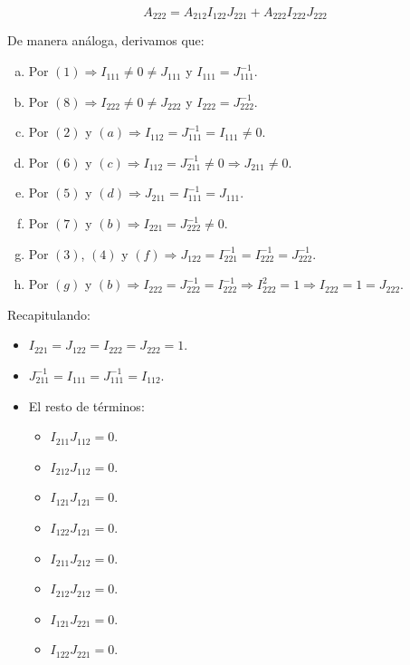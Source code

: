 \begin{equation}
A_{222} = A_{212} I_{122} J_{221} + A_{222} I_{222} J_{222}
\end{equation}

De manera análoga, derivamos que:

\begin{enumerate}[(a)]
	\item Por $(1) \Rightarrow I_{111} \neq 0 \neq J_{111}$ y $I_{111} = J_{111}^{-1}$.
	\item Por $(8) \Rightarrow I_{222} \neq 0 \neq J_{222}$ y $I_{222} = J_{222}^{-1}$.
	\item Por $(2)$ y $(a) \Rightarrow I_{112} = J_{111}^{-1} = I_{111} \neq 0$.
	\item Por $(6)$ y $(c) \Rightarrow I_{112} = J_{211}^{-1} \neq 0 \Rightarrow J_{211} \neq 0$.
	\item Por $(5)$ y $(d) \Rightarrow J_{211} = I_{111}^{-1} = J_{111}$.
	\item Por $(7)$ y $(b) \Rightarrow I_{221} = J_{222}^{-1} \neq 0$.
	\item Por $(3)$, $(4)$ y $(f) \Rightarrow J_{122} = I_{221}^{-1} = I_{222}^{-1} = J_{222}^{-1}$.
	\item Por $(g)$ y $(b) \Rightarrow I_{222} = J_{222}^{-1} = I_{222}^{-1} \Rightarrow I_{222}^2 = 1 \Rightarrow I_{222} = 1 = J_{222}$.
\end{enumerate}

\newpage

Recapitulando:

\begin{itemize}
	\item $I_{221} = J_{122} = I_{222} = J_{222} = 1$.
	\item $J_{211}^{-1} = I_{111} = J_{111}^{-1} = I_{112}$.
	\item El resto de términos:

	\begin{itemize}
		\item $I_{211} J_{112} = 0$.
		\item $I_{212} J_{112} = 0$.
		\item $I_{121} J_{121} = 0$.
		\item $I_{122} J_{121} = 0$.
		\item $I_{211} J_{212} = 0$.
		\item $I_{212} J_{212} = 0$.
		\item $I_{121} J_{221} = 0$.
		\item $I_{122} J_{221} = 0$.
	\end{itemize}
\end{itemize}

